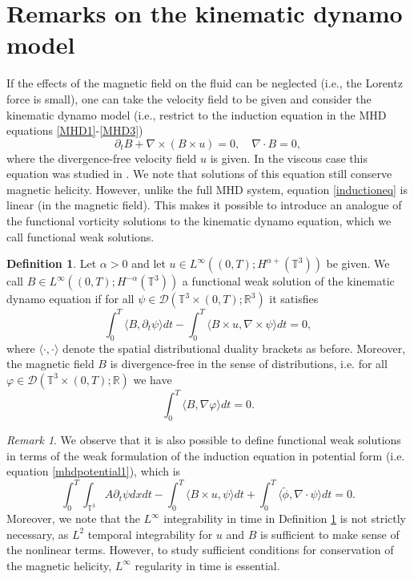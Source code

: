 \documentclass[12pt,a4paper]{article}
\theoremstyle{definition}
\newtheorem{definition}[theorem]{Definition}
\theoremstyle{remark}
\newtheorem{remark}[theorem]{Remark}
\numberwithin{equation}{section}
\begin{document}
\section{Remarks on the kinematic dynamo model} \label{dynamosection}
If the effects of the magnetic field on the fluid can be neglected (i.e., the Lorentz force is small), one can take the velocity field to be given and consider the kinematic dynamo model (i.e., restrict to the induction equation in the MHD equations \eqref{MHD1}-\eqref{MHD3}) \cite{davidson}
\begin{equation} \label{inductioneq}
\partial_t B + \nabla \times (B \times u) = 0, \quad \nabla \cdot B = 0,
\end{equation}
where the divergence-free velocity field $u$ is given.
In the viscous case this equation was studied in \cite{friedlander}. We note that solutions of this equation still conserve magnetic helicity. However, unlike the full MHD system, equation \eqref{inductioneq} is linear (in the magnetic field). This makes it possible to introduce an analogue of the functional vorticity solutions to the kinematic dynamo equation, which we call functional weak solutions.
\begin{definition} \label{functionalsolutiondef}
Let $\alpha > 0$ and let $u \in L^\infty ((0,T);H^{\alpha+} (\mathbb{T}^3))$ be given. We call $B \in L^\infty ((0,T);H^{-\alpha} (\mathbb{T}^3))$ a functional weak solution of the kinematic dynamo equation if for all $\psi \in \mathcal{D} (\mathbb{T}^3 \times (0,T);\mathbb{R}^3)$ it satisfies
\begin{equation}
\int_0^T \langle B , \partial_t \psi \rangle dt - \int_0^T \langle B \times u, \nabla \times \psi \rangle dt = 0,
\end{equation}
where $\langle \cdot, \cdot \rangle$ denote the spatial distributional duality brackets as before. Moreover, the magnetic field $B$ is divergence-free in the sense of distributions, i.e. for all $\varphi \in \mathcal{D} (\mathbb{T}^3 \times (0,T); \mathbb{R})$ we have
\begin{equation}
\int_0^T \langle B, \nabla \varphi \rangle dt = 0.
\end{equation}
\end{definition}
\begin{remark}
We observe that it is also possible to define functional weak solutions in terms of the weak formulation of the induction equation in potential form (i.e. equation \eqref{mhdpotential1}), which is
\begin{equation}
\int_0^T \int_{\mathbb{T}^3} A \partial_t \psi dx dt - \int_0^T \langle B \times u, \psi \rangle dt + \int_0^T \langle \tilde{\phi}, \nabla \cdot \psi \rangle dt = 0. 
\end{equation}
Moreover, we note that the $L^\infty$ integrability in time in Definition \ref{functionalsolutiondef} is not strictly necessary, as $L^2$ temporal integrability for $u$ and $B$ is sufficient to make sense of the nonlinear terms. However, to study sufficient conditions for conservation of the magnetic helicity, $L^\infty$ regularity in time is essential. 
\end{remark}
\end{document}
